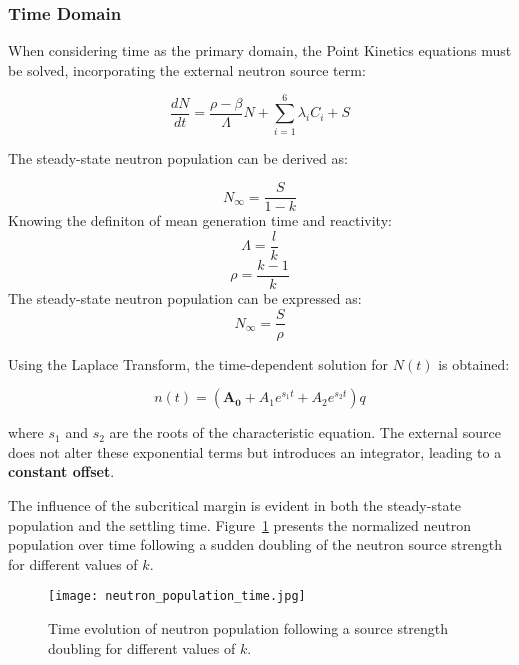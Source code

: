 \subsubsection{Time Domain}

When considering time as the primary domain, the Point Kinetics equations must be solved, incorporating the external neutron source term:

\begin{equation}
\frac{dN}{dt} = \frac{\rho - \beta}{\Lambda} N + \sum_{i=1}^{6} \lambda_i C_i + S
\end{equation}

The steady-state neutron population can be derived as:

\begin{equation}
    N_{\infty} = \frac{S}{1 - k}
\end{equation}
Knowing the definiton of mean generation time and reactivity:
\begin{equation}
    \Lambda =\frac{l}{k}
\end{equation}
\hspace{1cm}
\begin{equation}
    \rho = \frac{k-1}{k}
\end{equation}
The steady-state neutron population can be expressed as:
\begin{equation}
    N_{\infty} = \frac{S}{\rho}
\end{equation}

Using the Laplace Transform, the time-dependent solution for $ N(t)$ is obtained:

\begin{equation}
n(t) = \left(\mathbf{A_0} + A_1 e^{s_1 t} + A_2 e^{s_2 t}\right) q
\end{equation}

where $ s_1 $ and $ s_2 $ are the roots of the characteristic equation. The external source does not alter these exponential terms but introduces an integrator, leading to a \textbf{constant offset}.

The influence of the subcritical margin is evident in both the steady-state population and the settling time. Figure~\ref{fig:n_vs_time} presents the normalized neutron population over time following a sudden doubling of the neutron source strength for different values of $ k $.

\begin{figure}[H]
    \centering
    \texttt{[image: neutron\_population\_time.jpg]} %
    \caption{Time evolution of neutron population following a source strength doubling for different values of \( k \).}
    \label{fig:n_vs_time}
\end{figure}

